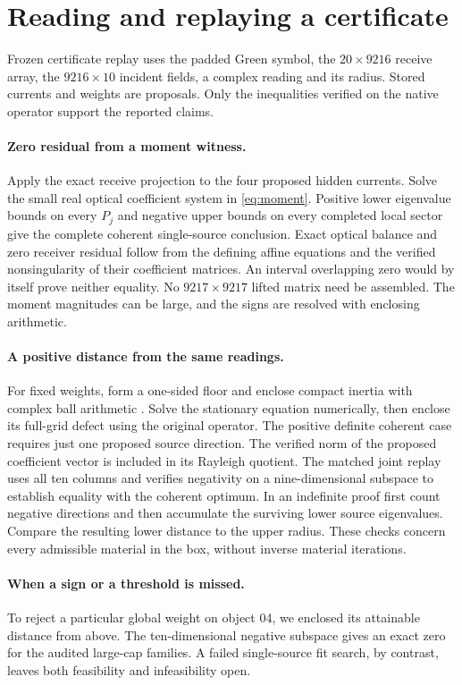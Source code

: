 \documentclass[anonymous,12pt]{iopjournal}
\theoremstyle{remark}\newtheorem{remark}[theorem]{Remark}
\numberwithin{equation}{section}
\begin{document}
\appendix
\section{Reading and replaying a certificate}\label{app:replay}

Frozen certificate replay uses the padded Green symbol, the $20\times9216$ receive array, the $9216\times10$ incident fields, a complex reading and its radius. Stored currents and weights are proposals. Only the inequalities verified on the native operator support the reported claims.

\paragraph{Zero residual from a moment witness.}
Apply the exact receive projection to the four proposed hidden currents. Solve the small real optical coefficient system in \eqref{eq:moment}. Positive lower eigenvalue bounds on every $P_j$ and negative upper bounds on every completed local sector give the complete coherent single-source conclusion. Exact optical balance and zero receiver residual follow from the defining affine equations and the verified nonsingularity of their coefficient matrices. An interval overlapping zero would by itself prove neither equality. No $9217\times9217$ lifted matrix need be assembled. The moment magnitudes can be large, and the signs are resolved with enclosing arithmetic.

\paragraph{A positive distance from the same readings.}
For fixed weights, form a one-sided floor and enclose compact inertia with complex ball arithmetic \cite{arb}. Solve the stationary equation numerically, then enclose its full-grid defect using the original operator. The positive definite coherent case requires just one proposed source direction. The verified norm of the proposed coefficient vector is included in its Rayleigh quotient. The matched joint replay uses all ten columns and verifies negativity on a nine-dimensional subspace to establish equality with the coherent optimum. In an indefinite proof first count negative directions and then accumulate the surviving lower source eigenvalues. Compare the resulting lower distance to the upper radius. These checks concern every admissible material in the box, without inverse material iterations.

\paragraph{When a sign or a threshold is missed.}
To reject a particular global weight on object 04, we enclosed its attainable distance from above. The ten-dimensional negative subspace gives an exact zero for the audited large-cap families. A failed single-source fit search, by contrast, leaves both feasibility and infeasibility open.
\end{document}
